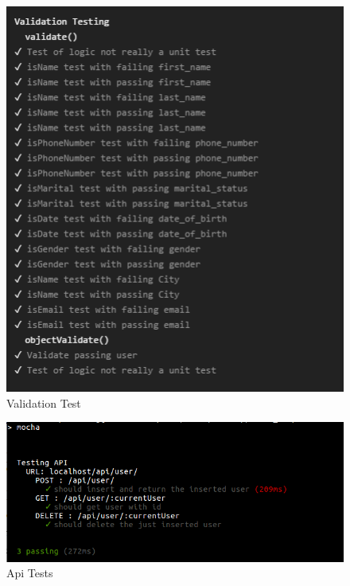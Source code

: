 \documentclass{article}
\begin{document}
	
	\begin{figure}[H]
	\includegraphics[width=15cm]{images/validationTest.png}
	\caption{Validation Test}
	\end{figure}	
	

	
	\begin{figure}[H]
	\includegraphics[width=15cm]{images/tests.png}
	\caption{Api Tests}
	\end{figure}
	

	
	
	\pagebreak
	
\end{document}
